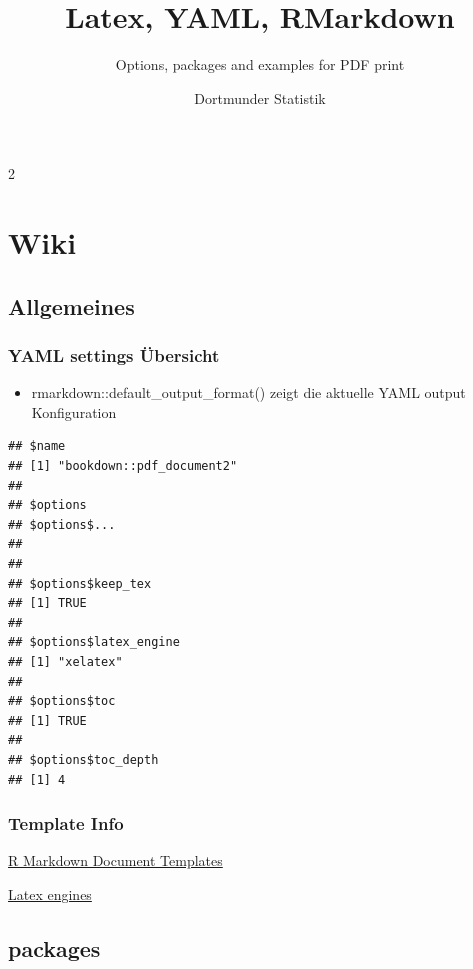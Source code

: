 \documentclass[
  a4paper,
  twoside]{article}
\title{Latex, YAML, RMarkdown}
\subtitle{Options, packages and examples for PDF print}
\author{Dortmunder Statistik}
\date{}
\providecommand{\tightlist}{%
  \setlength{\itemsep}{0pt}\setlength{\parskip}{0pt}}
\begin{document}
\maketitle

{
\hypersetup{linkcolor=}
\setcounter{tocdepth}{4}
\tableofcontents
}
\newpage

\begin {multicols}{2}

\hypertarget{wiki}{%
\section{Wiki}\label{wiki}}

\hypertarget{allgemeines}{%
\subsection{Allgemeines}\label{allgemeines}}

\hypertarget{yaml-settings-uxfcbersicht}{%
\subsubsection{YAML settings Übersicht}\label{yaml-settings-uxfcbersicht}}

\begin{itemize}
\tightlist
\item
  rmarkdown::default\_output\_format() zeigt die aktuelle YAML output Konfiguration
\end{itemize}

\begin{verbatim}
## $name
## [1] "bookdown::pdf_document2"
## 
## $options
## $options$...
## 
## 
## $options$keep_tex
## [1] TRUE
## 
## $options$latex_engine
## [1] "xelatex"
## 
## $options$toc
## [1] TRUE
## 
## $options$toc_depth
## [1] 4
\end{verbatim}

\hypertarget{template-info}{%
\subsubsection{Template Info}\label{template-info}}

\href{https://rstudio.github.io/rstudio-extensions/rmarkdown_templates.html}{R Markdown Document Templates}

\href{https://tex.stackexchange.com/questions/36/differences-between-luatex-context-and-xetex}{Latex engines}

\hypertarget{packages}{%
\subsection{packages}\label{packages}}


\end{multicols}
\end{document}
